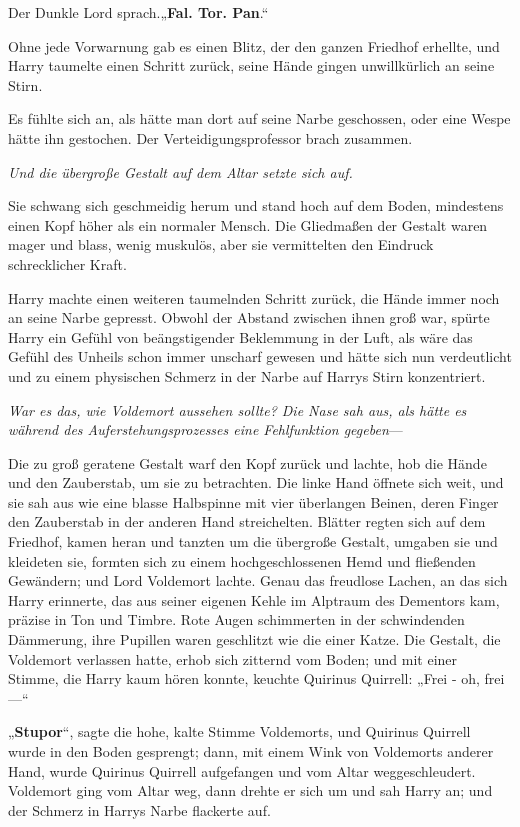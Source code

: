 {Der Dunkle Lord sprach.„\textbf{Fal. Tor. Pan}.“

Ohne jede Vorwarnung gab es einen Blitz, der den ganzen Friedhof erhellte, und Harry taumelte einen Schritt zurück, seine Hände gingen unwillkürlich an seine Stirn.

Es fühlte sich an, als hätte man dort auf seine Narbe geschossen, oder eine Wespe hätte ihn gestochen. Der Verteidigungsprofessor brach zusammen.

\emph{Und die übergroße Gestalt auf dem Altar setzte sich auf.}

Sie schwang sich geschmeidig herum und stand hoch auf dem Boden, mindestens einen Kopf höher als ein normaler Mensch. Die Gliedmaßen der Gestalt waren mager und blass, wenig muskulös, aber sie vermittelten den Eindruck schrecklicher Kraft.

Harry machte einen weiteren taumelnden Schritt zurück, die Hände immer noch an seine Narbe gepresst. Obwohl der Abstand zwischen ihnen groß war, spürte Harry ein Gefühl von beängstigender Beklemmung in der Luft, als wäre das Gefühl des Unheils schon immer unscharf gewesen und hätte sich nun verdeutlicht und zu einem physischen Schmerz in der Narbe auf Harrys Stirn konzentriert.

\emph{War es das, wie Voldemort aussehen sollte? Die Nase sah aus, als hätte es während des Auferstehungsprozesses eine Fehlfunktion gegeben}—

Die zu groß geratene Gestalt warf den Kopf zurück und lachte, hob die Hände und den Zauberstab, um sie zu betrachten. Die linke Hand öffnete sich weit, und sie sah aus wie eine blasse Halbspinne mit vier überlangen Beinen, deren Finger den Zauberstab in der anderen Hand streichelten. Blätter regten sich auf dem Friedhof, kamen heran und tanzten um die übergroße Gestalt, umgaben sie und kleideten sie, formten sich zu einem hochgeschlossenen Hemd und fließenden Gewändern; und Lord Voldemort lachte. Genau das freudlose Lachen, an das sich Harry erinnerte, das aus seiner eigenen Kehle im Alptraum des Dementors kam, präzise in Ton und Timbre. Rote Augen schimmerten in der schwindenden Dämmerung, ihre Pupillen waren geschlitzt wie die einer Katze. Die Gestalt, die Voldemort verlassen hatte, erhob sich zitternd vom Boden; und mit einer Stimme, die Harry kaum hören konnte, keuchte Quirinus Quirrell: „Frei - oh, frei—“

„\textbf{Stupor}“, sagte die hohe, kalte Stimme Voldemorts, und Quirinus Quirrell wurde in den Boden gesprengt; dann, mit einem Wink von Voldemorts anderer Hand, wurde Quirinus Quirrell aufgefangen und vom Altar weggeschleudert. Voldemort ging vom Altar weg, dann drehte er sich um und sah Harry an; und der Schmerz in Harrys Narbe flackerte auf.

}
